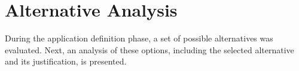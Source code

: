 \section{Alternative Analysis}

During the application definition phase, a set of possible alternatives was evaluated. Next, an analysis of these options, including the selected alternative and its justification, is presented.



